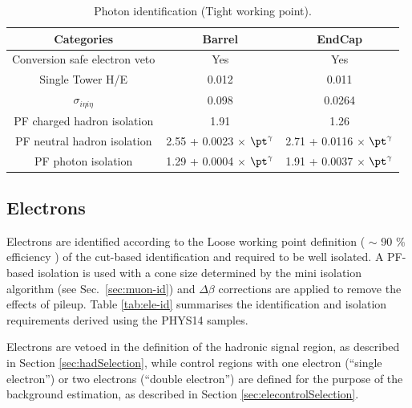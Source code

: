 \begin{table}[ht!]
  \caption{Photon identification (Tight working point).\label{tab:photon-id-gamma}}
  \centering
  \footnotesize
  \begin{tabular}{ ccc }
    \hline
    \hline
    Categories                    & Barrel                             & EndCap                             \\
    \hline
    Conversion safe electron veto & Yes                                & Yes                                \\
    Single Tower H/E              & 0.012                              & 0.011                               \\
    $\sigma_{i\eta i\eta}$        & 0.098                              & 0.0264                               \\
    PF charged hadron isolation   & 1.91                               & 1.26                               \\
    PF neutral hadron isolation   & 2.55 + 0.0023 $\times$ $\pt^{\gamma}$  & 2.71 + 0.0116 $\times$ $\pt^{\gamma}$  \\
    PF photon isolation           & 1.29 + 0.0004 $\times$ $\pt^{\gamma}$ & 1.91 + 0.0037 $\times$ $\pt^{\gamma}$ \\
    \hline
    \hline
  \end{tabular}
  \end{table}


\subsection{Electrons}
\label{sec:electron-id}
Electrons are identified according to the Loose working point definition ( $\sim$ 90 $\%$ efficiency ) 
of the cut-based identification \cite{electron-id} and 
required to be well isolated. 
A PF-based isolation \cite{pf-photon} is used with a cone size determined by the mini isolation algorithm (see Sec.~\ref{sec:muon-id}) and $\Delta \beta$ corrections are applied to remove the effects of pileup. 
Table \ref{tab:ele-id} summarises the identification and isolation requirements derived using the PHYS14 samples.

Electrons are vetoed in the definition of the hadronic signal region, 
as described in Section \ref{sec:hadSelection}, while 
control regions with one electron (``single electron'') or two electrons (``double electron'') are defined for the purpose of the background estimation, 
as described in Section \ref{sec:elecontrolSelection}.


